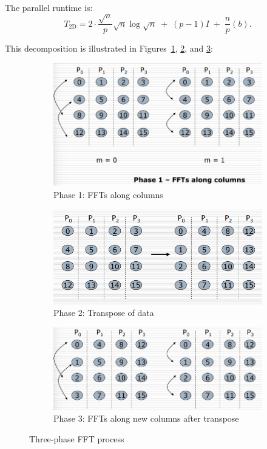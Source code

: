 \documentclass[12pt]{book}
\begin{document}
The parallel runtime is:
\[
T_{\text{2D}} = 2 \cdot \frac{\sqrt{n}}{p}\sqrt{n}\log \sqrt{n} \;+\; (p-1)I \;+\; \frac{n}{p}(b).
\]

This decomposition is illustrated in Figures~\ref{fig:P1FFT}, \ref{fig:P2trans}, and \ref{fig:P3fft}:

\begin{figure}[H]
    \centering
    \begin{subfigure}[b]{0.3\linewidth}
        \centering
        \includegraphics[width=\linewidth]{images/p1FFT.png}
        \caption{Phase 1: FFTs along columns}
        \label{fig:P1FFT}
    \end{subfigure}
    \hfill
    \begin{subfigure}[b]{0.3\linewidth}
        \centering
        \includegraphics[width=\linewidth]{images/P2trans.png}
        \caption{Phase 2: Transpose of data}
        \label{fig:P2trans}
    \end{subfigure}
    \hfill
    \begin{subfigure}[b]{0.3\linewidth}
        \centering
        \includegraphics[width=\linewidth]{images/P3FFT.png}
        \caption{Phase 3: FFTs along new columns after transpose}
        \label{fig:P3fft}
    \end{subfigure}
    \caption{Three-phase FFT process}
    \label{fig:ThreePhaseFFT}
\end{figure}
\end{document}
